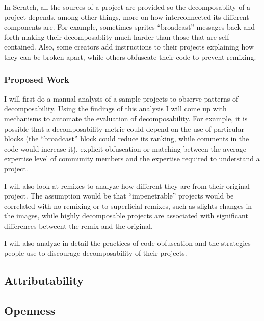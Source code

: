 In Scratch, all the sources of a project are provided so the decomposablity of a project depends, among other things, more on how interconnected its different components are. 
For example, sometimes sprites ``broadcast'' messages back and forth making their decomposablity much harder than those that are self-contained.
Also, some creators add instructions to their projects explaining how they can be broken apart, while others obfuscate their code to prevent remixing.

\subsubsection{Proposed Work}
I will first do a manual analysis of a sample projects to observe patterns of decomposability. 
Using the findings of this analysis I will come up with mechanisms to automate the evaluation of decomposability. 
For example, it is possible that a decomposability metric could depend on the use of particular blocks (the ``broadcast'' block could reduce its ranking, while comments in the code would increase it), explicit obfuscation or matching between the average expertise level of community members and the expertise required to understand a project.

I will also look at remixes to analyze how different they are from their original project. 
The assumption would be that ``impenetrable'' projects would be correlated with no remixing or to superficial remixes, such as slights changes in the images,
while highly decomposable projects are associated with significant differences betweent the remix and the original.

I will also analyze in detail the practices of code obfuscation and the strategies people use to discourage decomposability of their projects.

\subsection{Attributability}

\subsection{Openness}
% 

